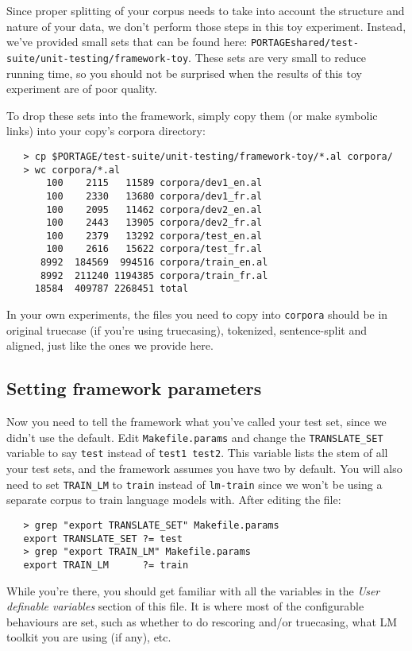 \documentclass[11pt]{article}
\begin{document}
Since proper splitting of your corpus needs to take into account the structure
and nature of your data, we don't perform those steps in this toy experiment.
Instead, we've provided small sets that can be found here:
\texttt{PORTAGEshared/test-suite/unit-testing/framework-toy}.  These sets
are very small to reduce running time, so you should not be surprised when the
results of this toy experiment are of poor quality.

To drop these sets into the framework, simply copy them (or make symbolic
links) into your copy's corpora directory:
\begin{verbatim}
   > cp $PORTAGE/test-suite/unit-testing/framework-toy/*.al corpora/
   > wc corpora/*.al
       100    2115   11589 corpora/dev1_en.al
       100    2330   13680 corpora/dev1_fr.al
       100    2095   11462 corpora/dev2_en.al
       100    2443   13905 corpora/dev2_fr.al
       100    2379   13292 corpora/test_en.al
       100    2616   15622 corpora/test_fr.al
      8992  184569  994516 corpora/train_en.al
      8992  211240 1194385 corpora/train_fr.al
     18584  409787 2268451 total
\end{verbatim}

In your own experiments, the files you need to copy into \texttt{corpora}
should be in original truecase (if you're using truecasing), tokenized,
sentence-split and aligned, just like the ones we provide here.

\subsection{Setting framework parameters} \label{FrameworkParams}

Now you need to tell the framework what you've called your test set, since we
didn't use the default.  Edit \texttt{Makefile.params} and change the
\texttt{TRANSLATE\_SET} variable to say
\texttt{test} instead of \texttt{test1 test2}.
This variable lists the stem of all your test sets, and the framework
assumes you have two by default.
You will also need to set \texttt{TRAIN\_LM} to \texttt{train} instead of
\texttt{lm-train} since we won't be using a separate corpus to train language
models with.
After editing the file:
\begin{verbatim}
   > grep "export TRANSLATE_SET" Makefile.params
   export TRANSLATE_SET ?= test
   > grep "export TRAIN_LM" Makefile.params
   export TRAIN_LM      ?= train
\end{verbatim}

While you're there, you should get familiar with all the variables in the
\emph{User definable variables} section of this file.  It is where most of the
configurable behaviours are set, such as whether to do rescoring and/or
truecasing, what LM toolkit you are using (if any), etc.  
\end{document}
